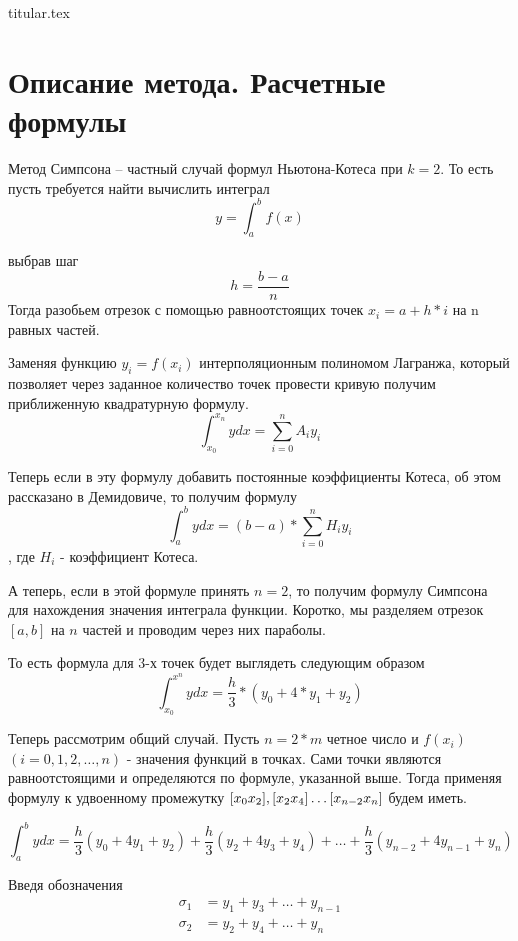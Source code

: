 \documentclass[11pt, a4paper]{article}
\begin{document}
{titular.tex}
\newpage

\section{Описание метода. Расчетные формулы}

Метод Симпсона -- частный случай формул Ньютона-Котеса при $k = 2$. То есть пусть требуется найти 
вычислить интеграл 
\[
y = \int_a^b f(x)
\]

выбрав шаг 
\[
  h = \dfrac{b - a}{n}
\]
Тогда разобьем отрезок с помощью равноотстоящих точек $x_i = a + h * i$ на n равных частей.

Заменяя функцию $y_i = f(x_i)$ интерполяционным полиномом Лагранжа, который позволяет через 
заданное количество точек провести кривую получим приближенную квадратурную формулу.
\[
  \int_{x_0}^{x_n} y dx = \sum_{i = 0}^{n} A_i y_i
\]

Теперь если в эту формулу добавить постоянные коэффициенты Котеса, об этом рассказано в Демидовиче, то получим 
формулу
\[
  \int_{a}^b y dx = (b-a) * \sum_{i = 0}^n H_i y_i
\], 
где $H_i$ - коэффициент Котеса.

А теперь, если в этой формуле принять $n = 2$, то получим формулу Симпсона для нахождения 
значения интеграла функции. Коротко, мы разделяем отрезок $[a, b]$ на $n$ частей и проводим
через них параболы. 

То есть формула для 3-х точек будет выглядеть следующим образом  
\[
  \int_{x_0}^{x^n} y dx = \dfrac{h}{3} * (y_0 + 4 * y_1 + y_2)
\]
\medskip

Теперь рассмотрим общий случай. Пусть $n = 2*m$ четное число и $f(x_i)$ $(i = 0, 1, 2, \ldots, n)$ - значения функций в точках.
Сами точки являются равноотстоящими и определяются по формуле, указанной выше. Тогда применяя 
формулу к удвоенному промежутку $[x_0 x_2], [x_2 x_4] \\ \ldots [x_{n-2} x_n]$ будем иметь.

\begin{equation*}
  \int_a^b y dx = \dfrac{h}{3} (y_0 + 4y_1 + y_2) + \dfrac{h}{3} (y_2 + 4y_3 + y_4) + \ldots
  + \dfrac{h}{3} (y_{n-2} + 4y_{n-1} + y_n) 
\end{equation*}

Введя обозначения 
\begin{align*}
  \sigma_1 &= y_1 + y_3 + \ldots + y_{n-1} \\
  \sigma_2 &= y_2 + y_4 + \ldots + y_n
\end{align*}
\end{document}
